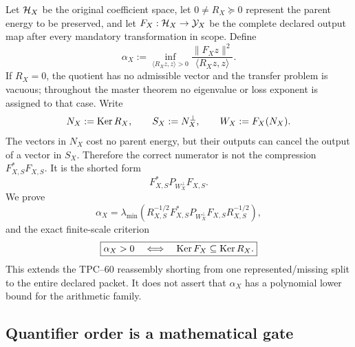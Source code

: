 Let \(\mathcal H_X\) be the original coefficient space, let
\(0\ne R_X\succeq0\) represent the parent energy to be preserved, and let
\(F_X:\mathcal H_X\to\mathcal Y_X\) be the complete declared output map after every
mandatory transformation in scope.  Define
\begin{equation}
 \alpha_X
 :=\inf_{\langle R_Xz,z\rangle>0}
   \frac{\|F_Xz\|^2}{\langle R_Xz,z\rangle}.
 \label{eq:tpc62-intro-master-constant}
\end{equation}
If \(R_X=0\), the quotient has no admissible vector and the transfer
problem is vacuous; throughout the master theorem no eigenvalue or loss
exponent is assigned to that case.
Write
\begin{equation}
 N_X:=\operatorname{Ker} R_X,
 \qquad S_X:=N_X^\perp,
 \qquad W_X:=F_X(N_X).
 \label{eq:tpc62-intro-master-spaces}
\end{equation}
The vectors in \(N_X\) cost no parent energy, but their outputs can cancel
the output of a vector in \(S_X\).  Therefore the correct numerator is not
the compression \(F_{X,S}^*F_{X,S}\).  It is the shorted form
\begin{equation}
 F_{X,S}^*P_{W_X^\perp}F_{X,S}.
 \label{eq:tpc62-intro-shorted-numerator}
\end{equation}
We prove
\begin{equation}
 \boxed{
 \alpha_X=\lambda_{\min}\!\left(
  R_{X,S}^{-1/2}F_{X,S}^*P_{W_X^\perp}F_{X,S}
  R_{X,S}^{-1/2}
 \right),}
 \label{eq:tpc62-intro-master-eigenvalue}
\end{equation}
and the exact finite-scale criterion
\begin{equation}
 \boxed{
 \alpha_X>0
 \quad\Longleftrightarrow\quad
 \operatorname{Ker} F_X\subseteq\operatorname{Ker} R_X.}
 \label{eq:tpc62-intro-master-kernel}
\end{equation}
This extends the TPC--60 reassembly shorting from one represented/missing
split to the entire declared packet.  It does not assert that
\(\alpha_X\) has a polynomial lower bound for the arithmetic family.

\subsection{Quantifier order is a mathematical gate}

